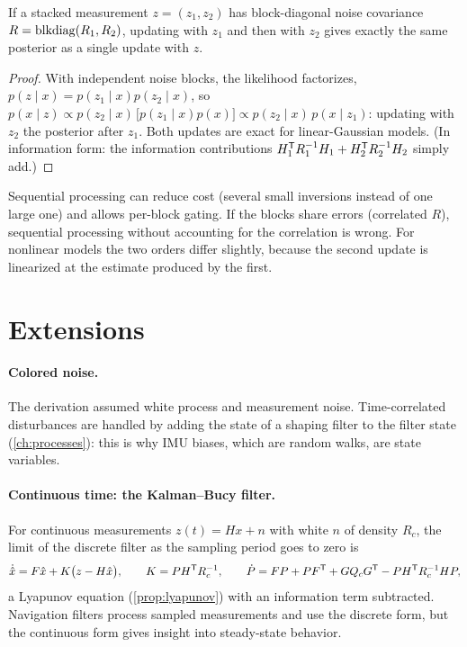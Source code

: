 \begin{proposition}
If a stacked measurement $z = (z_1, z_2)$ has block-diagonal noise covariance $R = \operatorname{blkdiag}(R_1, R_2)$, updating with $z_1$ and then with $z_2$ gives
exactly the same posterior as a single update with $z$.
\end{proposition}
\begin{proof}
With independent noise blocks, the likelihood factorizes, $p(z\mid x) = p(z_1\mid x)p(z_2\mid x)$, so
$p(x\mid z) \propto p(z_2\mid x)\,\big[p(z_1\mid x)p(x)\big] \propto p(z_2\mid x)\,p(x\mid z_1)$: updating with $z_2$ the posterior after $z_1$. Both updates are exact for linear-Gaussian
models. (In information form: the information contributions $H_1^{\mathsf{T}} R_1^{-1} H_1 + H_2^{\mathsf{T}} R_2^{-1} H_2$ simply add.)
\end{proof}

Sequential processing can reduce cost (several small inversions instead of one large one) and allows per-block gating. If the blocks share errors
(correlated $R$), sequential processing without accounting for the correlation is wrong. For nonlinear models the two orders differ slightly,
because the second update is linearized at the estimate produced by the first.

\section{Extensions}

\paragraph{Colored noise.} The derivation assumed white process and measurement noise. Time-correlated disturbances are handled by adding the state of
a shaping filter to the filter state (\cref{ch:processes}): this is why IMU biases, which are random walks, are state variables.

\paragraph{Continuous time: the Kalman--Bucy filter.} For continuous measurements $z(t) = Hx + n$ with white $n$ of density $R_c$, the limit of the discrete
filter as the sampling period goes to zero is
\begin{equation}
  \dot{\hat x} = F\hat x + K\big(z - H\hat x\big), \qquad K = PH^{\mathsf{T}} R_c^{-1}, \qquad \dot P = FP + PF^{\mathsf{T}} + GQ_cG^{\mathsf{T}} - PH^{\mathsf{T}} R_c^{-1} HP,
\end{equation}
a Lyapunov equation (\cref{prop:lyapunov}) with an information term subtracted. Navigation filters process sampled measurements and use the discrete
form, but the continuous form gives insight into steady-state behavior.

